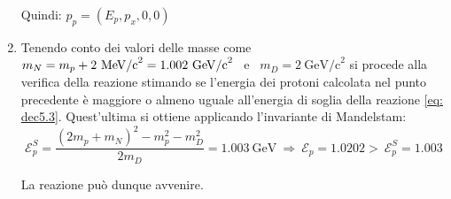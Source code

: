 \documentclass[12pt,twoside,a4]{article}
\begin{document}
\begin{solution}
\begin{enumerate}[label=(\textit{\roman*})]
Quindi: $p_p = (E_p , p_x , 0 , 0)$ 
\item Tenendo conto dei valori delle masse come $m_N = m_p + 2 \ \mathrm{\mev/c}^2 = 1.002 \ \mathrm{GeV/c}^2$ \ e \ $m_D = 2 \ \mathrm{GeV/c}^2$  si procede alla verifica della reazione stimando se l'energia dei protoni calcolata nel punto precedente è maggiore o almeno uguale all'energia di soglia della reazione \ref{eq: dec5.3}. Quest'ultima si ottiene applicando l'invariante di Mandelstam: \begin{equation*}
    \mathcal{E}^S_p = \frac{(2m_p + m_N)^2 - m^2_p - m^2_D}{2 m_D} = 1.003 \ \mathrm{GeV}  \  \Rightarrow  \  \mathcal{E}_p = 1.0202 > \  \mathcal{E}^S_p = 1.003  
\end{equation*}

La reazione può dunque avvenire.
\end{enumerate}
\end{solution}

\end{document}
